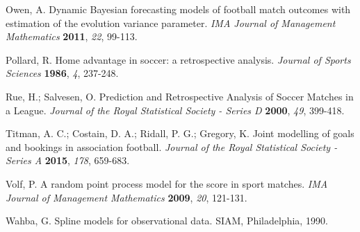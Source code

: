 \documentclass[journal,article,accept,moreauthors,pdftex,12pt,a4paper]{mdpi}
\begin{document}
\begin{thebibliography}{999}
		Owen, A. Dynamic Bayesian forecasting models of football match
		outcomes with estimation of the evolution variance parameter. {\em
			IMA Journal of Management Mathematics} {\bf 2011}, {\em 22}, 99-113.
		
		Pollard, R. Home advantage in soccer: a retrospective analysis. {\em Journal of Sports Sciences} {\bf 1986}, {\em 4}, 237-248.
		
		Rue, H.; Salvesen, O. Prediction and Retrospective Analysis of
		Soccer Matches in a League. {\em Journal of the Royal Statistical
			Society - Series D} {\bf 2000}, {\em 49}, 399-418.
		
		Titman, A. C.; Costain, D. A.; Ridall, P. G.; Gregory, K. Joint
		modelling of goals and bookings in association football. {\em
			Journal of the Royal Statistical Society - Series A} {\bf 2015},
		{\em 178}, 659-683.
		
		Volf, P. A random point process model for the score in sport
		matches. {\em IMA Journal of Management Mathematics} {\bf 2009},
		{\em 20}, 121-131.
		
		Wahba, G. Spline models for observational data. SIAM, Philadelphia,
		1990.
		
	\end{thebibliography}
	
	
	
	
	
	

\end{document}
